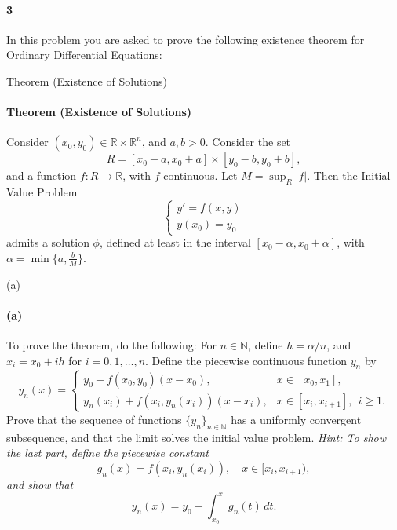 \documentclass[12pt]{article}
\newenvironment{fullbox}{\begin{lrbox}{\savefullbox}\begin{minipage}{\dimexpr\textwidth-2\fboxsep\relax}}{\end{minipage}\end{lrbox}\begin{center}\framebox[\textwidth]{\usebox{\savefullbox}}\end{center}}
\newenvironment{pbox}[1][]{\begin{fullbox}\ifx#1\empty\else\paragraph{#1}\fi}{\end{fullbox}}
\theoremstyle{definition}
\newcommand{\N}{\mathbb{N}}
\begin{document}
\newpage
\begin{pbox}[3]
    In this problem you are asked to prove the following existence theorem for Ordinary Differential Equations:
    \begin{pbox}[Theorem (Existence of Solutions)]
        Consider $(x_0,y_0)\in \mathbb{R}\times \mathbb{R}^n$, and
        $a,b>0$. Consider the set
        \[
        R = [x_0-a,x_0+a] \times [y_0-b,y_0+b],
        \]
        and a function $f:R\to \mathbb{R}$, with $f$ continuous. Let $M = \sup_R |f|$. Then
        the Initial Value Problem 
        \begin{equation}
        \left \{ \begin{array}{l}
            y'=f(x,y) \\
            y(x_0)= y_0 \end{array} \right .
        \end{equation}
        admits a solution $\phi$, defined at least in the interval
        $[x_0-\alpha, x_0+\alpha]$, with $\alpha=\min \{a, \frac{b}{M} \}$.
    \end{pbox}
\end{pbox}



\begin{pbox}[(a)]
    To prove the theorem, do the following: For $n\in \mathbb{N}$, define $h = \alpha/n$, and $x_i = x_0+i h$ for $i=0,1,\dots,n$. 
    Define the piecewise continuous function $y_n$ by 
    \begin{equation}
    y_n(x) = \left \{ \begin{array}{lr}
    y_0 + f(x_0,y_0)(x-x_0),& x \in [x_0,x_1],\\
    y_n(x_i) + f(x_i,y_n(x_i)) (x-x_i),& x \in [x_i,x_{i+1}],\ \ i\ge 1.
    \end{array} \right .
    \end{equation}
    Prove that the sequence of functions $\{y_n\}_{n\in\N}$ has a uniformly convergent subsequence, and that the limit solves the initial value problem.
    {\it Hint: To show the last part, define the piecewise constant
    \begin{equation}
    g_n(x) = f(x_i,y_n(x_i)),\quad x\in [x_i,x_{i+1}),
    \end{equation}
    and show that 
    \begin{equation}
    y_n(x) = y_0 + \int_{x_0}^x g_n(t)\,dt.
    \end{equation}
    }
\end{pbox}
\end{document}
